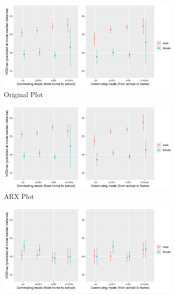 

    \begin{figure}[htbp]
        \centering
        \begin{subfigure}[b]{0.48\textwidth}
            \centering
            \includegraphics[width=\textwidth]{figs/r_orig_plot.png}
            \caption{Original Plot}
            \label{fig:r_orig_plot}
        \end{subfigure}
        \hspace{0.0\textwidth}
        \begin{subfigure}[b]{0.48\textwidth}
            \centering
            \includegraphics[width=\textwidth]{figs/r_arx_plot.png}
            \caption{ARX Plot}
            \label{fig:r_arx_plot}
        \end{subfigure}
        \vfill
        \begin{subfigure}[b]{0.48\textwidth}
            \centering
            \includegraphics[width=\textwidth]{figs/r_sdv_plot.png}

\end{subfigure}
\end{figure}
